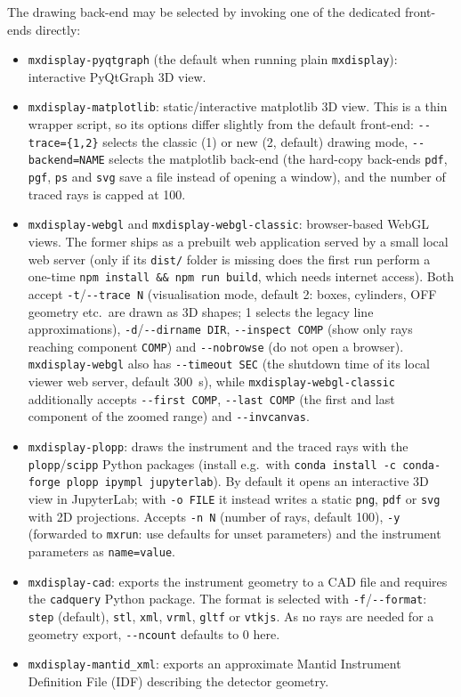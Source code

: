 The drawing back-end may be selected by invoking one of the dedicated
front-ends directly:
\begin{itemize}
\item \verb+mxdisplay-pyqtgraph+ (the default when running plain
  \verb+mxdisplay+): interactive PyQtGraph 3D view.
\item \verb+mxdisplay-matplotlib+: static/interactive matplotlib 3D view. This
  is a thin wrapper script, so its options differ slightly from the default
  front-end: \verb+--trace={1,2}+ selects the classic (1) or new (2, default)
  drawing mode, \verb+--backend=NAME+ selects the matplotlib back-end (the
  hard-copy back-ends \texttt{pdf}, \texttt{pgf}, \texttt{ps} and \texttt{svg}
  save a file instead of opening a window), and the number of traced rays is
  capped at 100.
\item \verb+mxdisplay-webgl+ and \verb+mxdisplay-webgl-classic+: browser-based
  WebGL views. The former ships as a prebuilt web application served by a small
  local web server (only if its \texttt{dist/} folder is missing does the first
  run perform a one-time \texttt{npm install \&\& npm run build}, which needs
  internet access). Both accept \verb+-t+/\verb+--trace N+ (visualisation mode,
  default 2: boxes, cylinders, OFF geometry etc.\ are drawn as 3D shapes; 1
  selects the legacy line approximations), \verb+-d+/\verb+--dirname DIR+,
  \verb+--inspect COMP+ (show only rays reaching component \texttt{COMP}) and
  \verb+--nobrowse+ (do not open a browser). \verb+mxdisplay-webgl+ also has
  \verb+--timeout SEC+ (the shutdown time of its local viewer web server,
  default 300~s), while \verb+mxdisplay-webgl-classic+ additionally accepts
  \verb+--first COMP+, \verb+--last COMP+ (the first and last component of the
  zoomed range) and \verb+--invcanvas+.
\item \verb+mxdisplay-plopp+: draws the instrument and the traced rays with
  the \texttt{plopp}/\texttt{scipp} Python packages (install e.g.\ with
  \texttt{conda install -c conda-forge plopp ipympl jupyterlab}). By default it
  opens an interactive 3D view in JupyterLab; with \verb+-o FILE+ it instead
  writes a static \texttt{png}, \texttt{pdf} or \texttt{svg} with 2D
  projections. Accepts \verb+-n N+ (number of rays, default 100), \verb+-y+
  (forwarded to \verb+mxrun+: use defaults for unset parameters) and the
  instrument parameters as \texttt{name=value}.
\item \verb+mxdisplay-cad+: exports the instrument geometry to a CAD file and
  requires the \texttt{cadquery} Python package. The format is selected with
  \verb+-f+/\verb+--format+: \texttt{step} (default), \texttt{stl},
  \texttt{xml}, \texttt{vrml}, \texttt{gltf} or \texttt{vtkjs}. As no rays
  are needed for a geometry export, \verb+--ncount+ defaults to 0 here.
\item \verb+mxdisplay-mantid_xml+: exports an approximate Mantid Instrument
  Definition File (IDF) describing the detector geometry.
\end{itemize}
